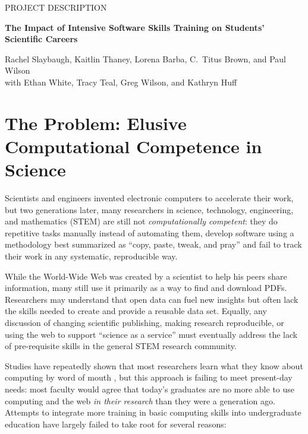 \documentclass{proposalnsf}
\newlength{\up}
\begin{document}
\newpage

\pagestyle{plain}
\renewcommand{\thepage} {\arabic{page}}

\begin{center}
\small{PROJECT DESCRIPTION}


\large\textbf{The Impact of Intensive Software Skills Training on Students' Scientific Careers}

{\large \sf Rachel Slaybaugh, Kaitlin Thaney, Lorena Barba, C.\ Titus Brown, and Paul Wilson\\ 
  with Ethan White, Tracy Teal, Greg Wilson, and Kathryn Huff}

\end{center}

\section{The Problem: Elusive Computational Competence in Science}

Scientists and engineers invented electronic computers to accelerate
their work, but two generations later, many researchers in science,
technology, engineering, and mathematics (STEM) are still not
\emph{computationally competent}: they do repetitive tasks manually
instead of automating them, develop software using a methodology best
summarized as ``copy, paste, tweak, and pray'' and fail to track
their work in any systematic, reproducible way.

While the World-Wide Web was created by a scientist to help his
peers share information, many still use it primarily as a way to find
and download PDFs.  Researchers may understand that open data can fuel
new insights but often lack the skills needed to create and provide a
reusable data set.  Equally, any discussion of changing scientific
publishing, making research reproducible, or using the web to support
``science as a service'' must eventually address the lack of
pre-requisite skills in the general STEM research community.

Studies have repeatedly shown that most researchers learn what they
know about computing by word of mouth \cite{hannay2009}, but this
approach is failing to meet present-day needs: most faculty would
agree that today's graduates are no more able to use computing and the
web \emph{in their research} than they were a generation ago.
Attempts to integrate more training in basic computing skills into
undergraduate education have largely failed to take root for several
reasons:
\end{document}
